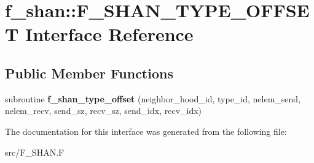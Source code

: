 \hypertarget{interfacef__shan_1_1F__SHAN__TYPE__OFFSET}{}\section{f\+\_\+shan\+:\+:F\+\_\+\+S\+H\+A\+N\+\_\+\+T\+Y\+P\+E\+\_\+\+O\+F\+F\+S\+ET Interface Reference}
\label{interfacef__shan_1_1F__SHAN__TYPE__OFFSET}
\subsection*{Public Member Functions}
\begin{DoxyCompactItemize}
\item 
subroutine {\bfseries f\+\_\+shan\+\_\+type\+\_\+offset} (neighbor\+\_\+hood\+\_\+id, type\+\_\+id, nelem\+\_\+send, nelem\+\_\+recv, send\+\_\+sz, recv\+\_\+sz, send\+\_\+idx, recv\+\_\+idx)\hypertarget{interfacef__shan_1_1F__SHAN__TYPE__OFFSET_a6de430a4c9cdbbbda6fd796aa22821c2}{}\label{interfacef__shan_1_1F__SHAN__TYPE__OFFSET_a6de430a4c9cdbbbda6fd796aa22821c2}

\end{DoxyCompactItemize}


The documentation for this interface was generated from the following file\+:\begin{DoxyCompactItemize}
\item 
src/F\+\_\+\+S\+H\+A\+N.\+F\end{DoxyCompactItemize}
